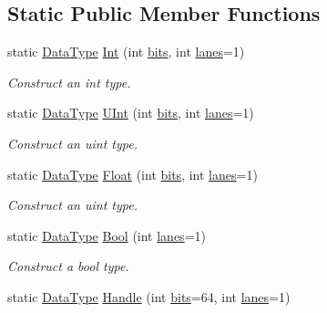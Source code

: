 \subsection*{Static Public Member Functions}
\begin{DoxyCompactItemize}
\item 
static \hyperlink{classtvm_1_1runtime_1_1DataType}{Data\+Type} \hyperlink{classtvm_1_1runtime_1_1DataType_ab45f13dd70d982d9f977c79b6f7fac98}{Int} (int \hyperlink{classtvm_1_1runtime_1_1DataType_ac26a4b0d3de99a8c08ecc2618a8659d9}{bits}, int \hyperlink{classtvm_1_1runtime_1_1DataType_abc92c7ca9966808f024983c76e12cf4a}{lanes}=1)
\begin{DoxyCompactList}\small\item\em Construct an int type. \end{DoxyCompactList}\item 
static \hyperlink{classtvm_1_1runtime_1_1DataType}{Data\+Type} \hyperlink{classtvm_1_1runtime_1_1DataType_ad1cf4571ee1a22c188c66ee2e6e6c042}{U\+Int} (int \hyperlink{classtvm_1_1runtime_1_1DataType_ac26a4b0d3de99a8c08ecc2618a8659d9}{bits}, int \hyperlink{classtvm_1_1runtime_1_1DataType_abc92c7ca9966808f024983c76e12cf4a}{lanes}=1)
\begin{DoxyCompactList}\small\item\em Construct an uint type. \end{DoxyCompactList}\item 
static \hyperlink{classtvm_1_1runtime_1_1DataType}{Data\+Type} \hyperlink{classtvm_1_1runtime_1_1DataType_a237a714a6a16e14aa01fa4ac52426551}{Float} (int \hyperlink{classtvm_1_1runtime_1_1DataType_ac26a4b0d3de99a8c08ecc2618a8659d9}{bits}, int \hyperlink{classtvm_1_1runtime_1_1DataType_abc92c7ca9966808f024983c76e12cf4a}{lanes}=1)
\begin{DoxyCompactList}\small\item\em Construct an uint type. \end{DoxyCompactList}\item 
static \hyperlink{classtvm_1_1runtime_1_1DataType}{Data\+Type} \hyperlink{classtvm_1_1runtime_1_1DataType_a43941f847c40049ef292dc2873483e0d}{Bool} (int \hyperlink{classtvm_1_1runtime_1_1DataType_abc92c7ca9966808f024983c76e12cf4a}{lanes}=1)
\begin{DoxyCompactList}\small\item\em Construct a bool type. \end{DoxyCompactList}\item 
static \hyperlink{classtvm_1_1runtime_1_1DataType}{Data\+Type} \hyperlink{classtvm_1_1runtime_1_1DataType_aebad9f7235dd20af649fb5c2113797b8}{Handle} (int \hyperlink{classtvm_1_1runtime_1_1DataType_ac26a4b0d3de99a8c08ecc2618a8659d9}{bits}=64, int \hyperlink{classtvm_1_1runtime_1_1DataType_abc92c7ca9966808f024983c76e12cf4a}{lanes}=1)

\end{DoxyCompactItemize}
